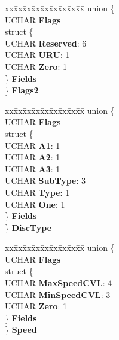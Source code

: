 \begin{DoxyCompactItemize}
\begin{tabbing}
\end{tabbing}\item 
\mbox{\label{struct___r_e_a_d___t_o_c___a_t_i_p_a1288a12c1552e8363a7622e6d833b313}} 
\begin{tabbing}
xx\=xx\=xx\=xx\=xx\=xx\=xx\=xx\=xx\=\kill
union \{\\
\>UCHAR {\bfseries Flags}\\
\>struct \{\\
\>\>UCHAR {\bfseries Reserved}: 6\\
\>\>UCHAR {\bfseries URU}: 1\\
\>\>UCHAR {\bfseries Zero}: 1\\
\>\} {\bfseries Fields}\\
\} {\bfseries Flags2}\\

\end{tabbing}\item 
\mbox{\label{struct___r_e_a_d___t_o_c___a_t_i_p_ac70f8538cf581d70d0fa0f0629cbc957}} 
\begin{tabbing}
xx\=xx\=xx\=xx\=xx\=xx\=xx\=xx\=xx\=\kill
union \{\\
\>UCHAR {\bfseries Flags}\\
\>struct \{\\
\>\>UCHAR {\bfseries A1}: 1\\
\>\>UCHAR {\bfseries A2}: 1\\
\>\>UCHAR {\bfseries A3}: 1\\
\>\>UCHAR {\bfseries SubType}: 3\\
\>\>UCHAR {\bfseries Type}: 1\\
\>\>UCHAR {\bfseries One}: 1\\
\>\} {\bfseries Fields}\\
\} {\bfseries DiscType}\\

\end{tabbing}\item 
\mbox{\label{struct___r_e_a_d___t_o_c___a_t_i_p_aa0180f1f9fcd2293ec3cf580ada69f88}} 
\begin{tabbing}
xx\=xx\=xx\=xx\=xx\=xx\=xx\=xx\=xx\=\kill
union \{\\
\>UCHAR {\bfseries Flags}\\
\>struct \{\\
\>\>UCHAR {\bfseries MaxSpeedCVL}: 4\\
\>\>UCHAR {\bfseries MinSpeedCVL}: 3\\
\>\>UCHAR {\bfseries Zero}: 1\\
\>\} {\bfseries Fields}\\
\} {\bfseries Speed}\\


\end{tabbing}
\end{DoxyCompactItemize}
